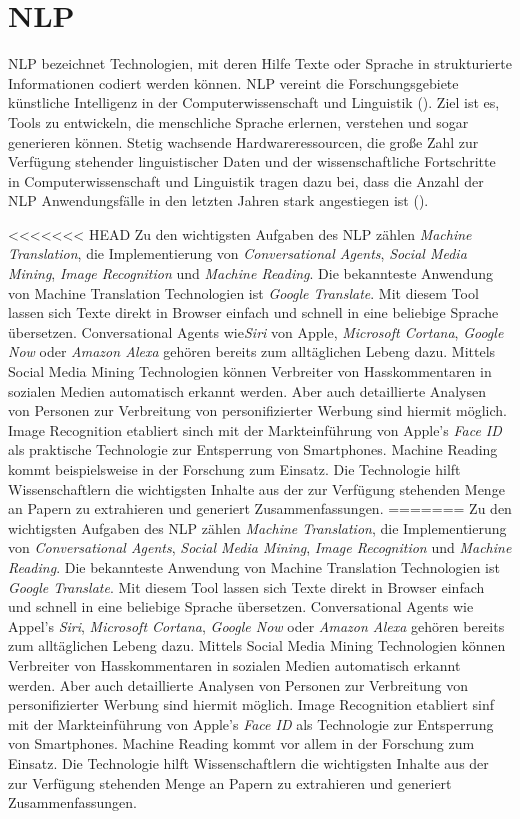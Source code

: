 \section{NLP}

\ac{NLP} bezeichnet Technologien, mit deren Hilfe Texte oder Sprache in strukturierte Informationen codiert werden können. \ac{NLP} vereint die Forschungsgebiete künstliche Intelligenz in der Computerwissenschaft und Linguistik (\cite[vgl.][1]{ITWISSEN}). Ziel ist es, Tools zu entwickeln, die menschliche Sprache erlernen, verstehen und sogar generieren können. Stetig wachsende Hardwareressourcen, die große Zahl zur Verfügung stehender linguistischer Daten und der wissenschaftliche Fortschritte in Computerwissenschaft und Linguistik tragen dazu bei, dass die Anzahl der \ac{NLP} Anwendungsfälle in den letzten Jahren stark angestiegen ist (\cite[vgl.][1]{HIRSCHBERG}). 
\par
<<<<<<< HEAD
Zu den wichtigsten Aufgaben des \ac{NLP} zählen \textit{Machine Translation}, die Implementierung von \textit{Conversational Agents}, \textit{Social Media Mining}, \textit{Image Recognition} und \textit{Machine Reading}. Die bekannteste Anwendung  von Machine Translation Technologien ist \textit{Google Translate}. Mit diesem Tool lassen sich Texte direkt in Browser einfach und schnell in eine beliebige Sprache übersetzen. Conversational Agents wie\textit{Siri} von Apple, \textit{Microsoft Cortana}, \textit{Google Now} oder \textit{Amazon Alexa} gehören bereits zum alltäglichen Lebeng dazu. Mittels Social Media Mining Technologien können Verbreiter von Hasskommentaren in sozialen Medien automatisch erkannt werden. Aber auch detaillierte Analysen von Personen zur Verbreitung von personifizierter Werbung sind hiermit möglich. Image Recognition etabliert sinch mit der Markteinführung von Apple's \textit{Face ID} als praktische Technologie zur Entsperrung von Smartphones. Machine Reading kommt beispielsweise in der Forschung zum Einsatz. Die Technologie hilft Wissenschaftlern die wichtigsten Inhalte aus der zur Verfügung stehenden Menge an Papern zu extrahieren und generiert Zusammenfassungen.
=======
Zu den wichtigsten Aufgaben des \ac{NLP} zählen \textit{Machine Translation}, die Implementierung von \textit{Conversational Agents}, \textit{Social Media Mining}, \textit{Image Recognition} und \textit{Machine Reading}. Die bekannteste Anwendung  von Machine Translation Technologien ist \textit{Google Translate}. Mit diesem Tool lassen sich Texte direkt in Browser einfach und schnell in eine beliebige Sprache übersetzen. Conversational Agents wie Appel's\textit{ Siri}, \textit{Microsoft Cortana}, \textit{Google Now} oder \textit{Amazon Alexa} gehören bereits zum alltäglichen Lebeng dazu. Mittels Social Media Mining Technologien können Verbreiter von Hasskommentaren in sozialen Medien automatisch erkannt werden. Aber auch detaillierte Analysen von Personen zur Verbreitung von personifizierter Werbung sind hiermit möglich. Image Recognition etabliert sinf mit der Markteinführung von Apple's \textit{Face ID} als Technologie zur Entsperrung von Smartphones. Machine Reading kommt vor allem in der Forschung zum Einsatz. Die Technologie hilft Wissenschaftlern die wichtigsten Inhalte aus der zur Verfügung stehenden Menge an Papern zu extrahieren und generiert Zusammenfassungen.
